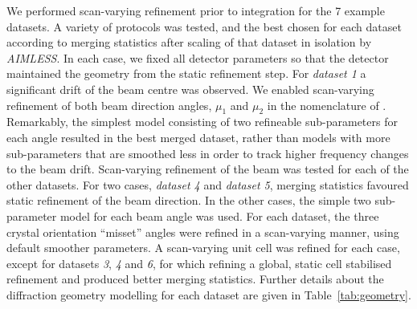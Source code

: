 \documentclass[preprint]{iucr}
\newcommand{\dials}{\emph{DIALS}\xspace}
\newcommand{\dialsrefine}{\emph{dials.refine}\xspace}
\newcommand{\aimless}{\emph{AIMLESS}\xspace}
\begin{document}

We performed scan-varying refinement prior to integration for the 7 example
datasets. A variety of protocols was tested, and the best chosen for each
dataset according to merging statistics after scaling of that dataset in
isolation by \aimless \cite{Evans2013}. In each case, we fixed all detector
parameters so that the detector maintained the geometry from the static
refinement step. For \emph{dataset 1} a significant drift of the beam centre
was observed. We enabled scan-varying refinement of both beam direction angles,
$\mu_1$ and $\mu_2$ in the nomenclature of .
Remarkably, the simplest model consisting of two refineable sub-parameters for
each angle resulted in the best merged dataset, rather than models with more
sub-parameters that are smoothed less in order to track higher frequency
changes to the beam drift. Scan-varying refinement of the beam was tested for
each of the other datasets. For two cases, \emph{dataset 4} and
\emph{dataset 5}, merging statistics favoured static refinement of the beam
direction. In the other cases, the simple two sub-parameter model for each
beam angle was used. For each dataset, the three crystal orientation ``misset''
angles were refined in a scan-varying manner, using default smoother parameters.
A scan-varying unit cell was refined for each case, except for datasets
\emph{3}, \emph{4} and \emph{6}, for which refining a global, static cell
stabilised refinement and produced better merging statistics.
Further details about the diffraction geometry modelling for each dataset
are given in Table~\ref{tab:geometry}.
\end{document}
